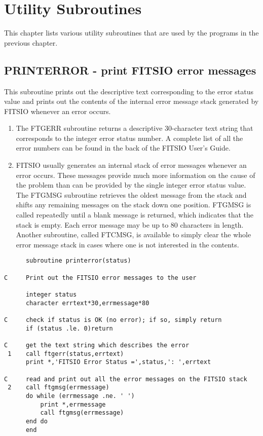 \chapter{Utility Subroutines }

This chapter lists various utility subroutines that are
used by the programs in the previous chapter.

\newpage

\section{PRINTERROR - print FITSIO error messages}

This subroutine prints out the descriptive text corresponding to the
error status value and prints out the contents of the internal
error message stack generated by FITSIO whenever an error occurs.

\begin{enumerate}
\item
The FTGERR subroutine returns a descriptive 30-character text string that
corresponds to the integer error status number.  A complete list of
all the error numbers can be found in the back of the FITSIO User's
Guide.

\item
FITSIO usually generates an internal stack of error messages whenever
an error occurs.  These messages provide much more information on the
cause of the problem than can be provided by the single integer error
status value.  The FTGMSG subroutine retrieves the oldest message from
the stack and shifts any remaining messages on the stack down one
position.  FTGMSG is called repeatedly until a blank message is
returned, which indicates that the stack is empty.  Each error message
may be up to 80 characters in length.  Another subroutine, called
FTCMSG, is available to simply clear the whole error message stack in
cases where one is not interested in the contents.
\end{enumerate}
\newpage
\begin{verbatim}
      subroutine printerror(status)

C     Print out the FITSIO error messages to the user

      integer status
      character errtext*30,errmessage*80

C     check if status is OK (no error); if so, simply return
      if (status .le. 0)return

C     get the text string which describes the error
 1    call ftgerr(status,errtext)
      print *,'FITSIO Error Status =',status,': ',errtext

C     read and print out all the error messages on the FITSIO stack
 2    call ftgmsg(errmessage)
      do while (errmessage .ne. ' ')
          print *,errmessage
          call ftgmsg(errmessage)
      end do
      end
\end{verbatim}
\newpage
